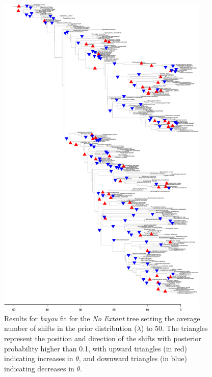 \begin{figure}[H]
\includegraphics[width=0.9\textwidth]{img/plots-noextant-wZBL-k50-1.pdf}
\caption{Results for \textit{bayou} fit for the \textit{No Extant} tree setting the average number of shifts in the prior distribution ($\lambda$) to 50. The triangles represent the position and direction of the shifts with posterior probability higher than 0.1, with upward triangles (in red) indicating increases in $\theta$, and downward triangles (in blue) indicating decreases in $\theta$.}
\label{fig:noextant-k50}
\end{figure}

\newpage

